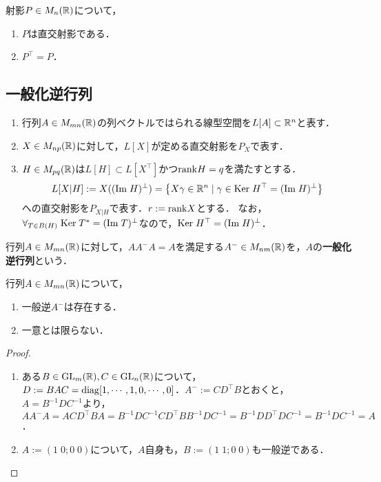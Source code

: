 \documentclass[uplatex,dvipdfmx]{jsreport}
\begin{document}
\begin{lemma}
    射影$P\in M_n(\mathbb{R})$について，
    \begin{enumerate}
        \item $P$は直交射影である．
        \item $P^\top=P$．
    \end{enumerate}
\end{lemma}

\subsection{一般化逆行列}

\begin{notation}\mbox{}
    \begin{enumerate}
        \item 行列$A\in M_{mn}(\mathbb{R})$の列ベクトルではられる線型空間を$L[A]\subset\mathbb{R}^n$と表す．
        \item $X\in M_{np}(\mathbb{R})$に対して，$L[X]$が定める直交射影を$P_X$で表す．
        \item $H\in M_{pq}(\mathbb{R})$は$L[H]\subset L[X^\top]$かつ$\mathrm{rank} H=q$を満たすとする．
        \[L[X|H]:=X((\mathrm{Im}\; H)^\perp)=\left\{X\gamma\in\mathbb{R}^n\mid\gamma\in\mathrm{Ker}\; H^\top=(\mathrm{Im}\; H)^\perp\right\}\]
        への直交射影を$P_{X|H}$で表す．$r:=\mathrm{rank} X$とする．
        なお，$\forall_{T\in B(H)}\;\mathrm{Ker}\; T^*=(\mathrm{Im}\; T)^\perp$なので，$\mathrm{Ker}\; H^\top=(\mathrm{Im}\; H)^\perp$．
    \end{enumerate}
\end{notation}

\begin{definition}
    行列$A\in M_{mn}(\mathbb{R})$に対して，$AA^-A=A$を満足する$A^-\in M_{nm}(\mathbb{R})$を，$A$の\textbf{一般化逆行列}という．
\end{definition}

\begin{lemma}
    行列$A\in M_{mn}(\mathbb{R})$について，
    \begin{enumerate}
        \item 一般逆$A^-$は存在する．
        \item 一意とは限らない．
    \end{enumerate}
\end{lemma}
\begin{proof}\mbox{}
    \begin{enumerate}
        \item ある$B\in\mathrm{GL}_m(\mathbb{R}),C\in\mathrm{GL}_n(\mathbb{R})$について，$D:=BAC=\mathrm{diag}[1,\cdots,1,0,\cdots,0]$．$A^-:=CD^\top B$とおくと，
        $A=B^{-1}DC^{-1}$より，
        $AA^-A=ACD^\top BA=B^{-1}DC^{-1}CD^\top BB^{-1}DC^{-1}=B^{-1}DD^\top DC^{-1}=B^{-1}DC^{-1}=A$．
        \item $A:=(1\;0;0\;0)$について，$A$自身も，$B:=(1\;1;0\;0)$も一般逆である．
    \end{enumerate}
\end{proof}
\end{document}
